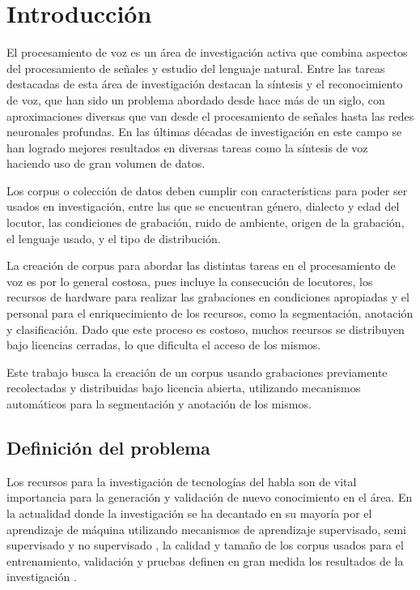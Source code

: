 \chapter{Introducción}

El procesamiento de voz es un área de investigación activa que combina aspectos del procesamiento de señales y estudio del lenguaje natural. Entre las tareas destacadas de esta área de investigación destacan la síntesis y el reconocimiento de voz, que han sido un problema abordado desde hace más de un siglo, con aproximaciones diversas que van desde el procesamiento de señales hasta las redes neuronales profundas.  En las últimas décadas de investigación en este campo se han logrado mejores resultados en diversas tareas como la síntesis de voz haciendo uso de gran volumen de datos.

Los corpus o colección de datos deben cumplir con características para poder ser usados en investigación, entre las que se encuentran género, dialecto y edad del locutor, las condiciones de grabación, ruido de ambiente, origen de la grabación, el lenguaje usado, y el tipo de distribución.

La creación de corpus para abordar las distintas tareas en el procesamiento de voz es por lo general costosa, pues incluye la consecución de locutores, los recursos de hardware para realizar las grabaciones en condiciones apropiadas y el personal para el enriquecimiento de los recursos, como la segmentación, anotación y clasificación. Dado que este proceso es costoso, muchos recursos se distribuyen bajo licencias cerradas, lo que dificulta el acceso de los mismos.

Este trabajo busca la creación de un corpus usando grabaciones previamente recolectadas y distribuidas bajo licencia abierta, utilizando mecanismos automáticos para la segmentación y anotación de los mismos.

\section{Definición del problema}

Los recursos para la investigación de tecnologías del habla son de vital importancia para la generación y validación de nuevo conocimiento en el área. En la actualidad donde la investigación se ha decantado en su mayoría por el aprendizaje de máquina utilizando mecanismos de aprendizaje supervisado, semi supervisado y no supervisado \cite{Chiu2018} \cite{AmazonSemiSupervised}  \cite{ZeroResources}, la calidad y tamaño de los corpus usados para el entrenamiento, validación y pruebas definen en gran medida los resultados de la investigación \cite{Hernandez-Mena2017AutomaticResources}.


